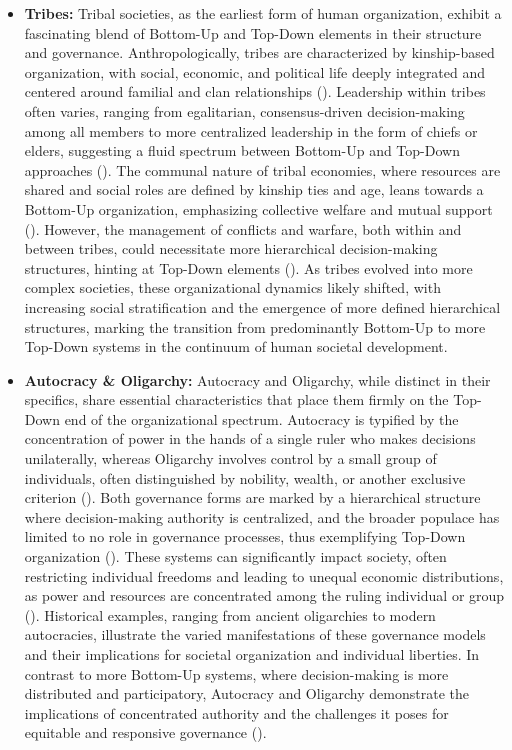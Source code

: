 \documentclass{article}
\begin{document}
\begin{itemize}
    \item \textbf{Tribes:} Tribal societies, as the earliest form of human organization, exhibit a fascinating blend of Bottom-Up and Top-Down elements in their structure and governance. Anthropologically, tribes are characterized by kinship-based organization, with social, economic, and political life deeply integrated and centered around familial and clan relationships (\cite{anthroStudies}). Leadership within tribes often varies, ranging from egalitarian, consensus-driven decision-making among all members to more centralized leadership in the form of chiefs or elders, suggesting a fluid spectrum between Bottom-Up and Top-Down approaches (\cite{fukuyama}). The communal nature of tribal economies, where resources are shared and social roles are defined by kinship ties and age, leans towards a Bottom-Up organization, emphasizing collective welfare and mutual support (\cite{evolutionaryAnthro}). However, the management of conflicts and warfare, both within and between tribes, could necessitate more hierarchical decision-making structures, hinting at Top-Down elements (\cite{keeley}). As tribes evolved into more complex societies, these organizational dynamics likely shifted, with increasing social stratification and the emergence of more defined hierarchical structures, marking the transition from predominantly Bottom-Up to more Top-Down systems in the continuum of human societal development.
    \item \textbf{Autocracy \& Oligarchy:} Autocracy and Oligarchy, while distinct in their specifics, share essential characteristics that place them firmly on the Top-Down end of the organizational spectrum. Autocracy is typified by the concentration of power in the hands of a single ruler who makes decisions unilaterally, whereas Oligarchy involves control by a small group of individuals, often distinguished by nobility, wealth, or another exclusive criterion (\cite{textbook}). Both governance forms are marked by a hierarchical structure where decision-making authority is centralized, and the broader populace has limited to no role in governance processes, thus exemplifying Top-Down organization (\cite{paxton}). These systems can significantly impact society, often restricting individual freedoms and leading to unequal economic distributions, as power and resources are concentrated among the ruling individual or group (\cite{dyeZeigler}). Historical examples, ranging from ancient oligarchies to modern autocracies, illustrate the varied manifestations of these governance models and their implications for societal organization and individual liberties. In contrast to more Bottom-Up systems, where decision-making is more distributed and participatory, Autocracy and Oligarchy demonstrate the implications of concentrated authority and the challenges it poses for equitable and responsive governance (\cite{comparativePolitics}).

\end{itemize}
\end{document}
